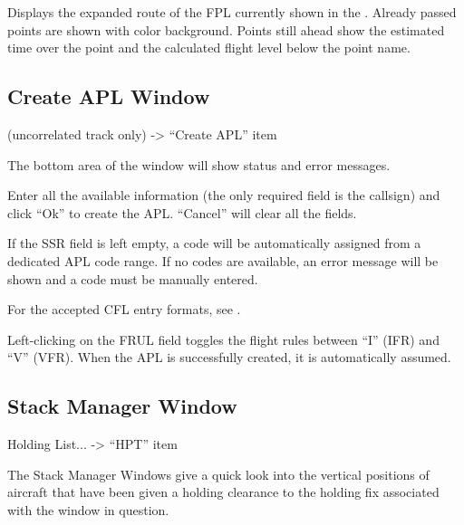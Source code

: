 \documentclass[a4paper,oneside,11pt]{memoir}
\begin{document}
\bigskip


Displays the expanded route of the FPL currently shown in the . Already passed points are shown with  color background. Points still ahead show the estimated time over the point and the calculated flight level below the point name.

\subsection{Create APL Window}
\label{win:apl}

 (uncorrelated track only) -> “Create APL” item


\bigskip

The bottom area of the window will show status and error messages.

\bigskip

Enter all the available information (the only required field is the callsign) and click “Ok” to create the APL. “Cancel” will clear all the fields.

\bigskip

If the SSR field is left empty, a code will be automatically assigned from a dedicated APL code range. If no codes are available, an error message will be shown and a code must be manually entered.

\bigskip

For the accepted CFL entry formats, see .

\bigskip

Left-clicking on the FRUL field toggles the flight rules between “I” (IFR) and “V” (VFR).
When the APL is successfully created, it is automatically assumed.

\subsection{Stack Manager Window}
\label{win:smw}
Holding List... -> “HPT” item

\bigskip


The Stack Manager Windows give a quick look into the vertical positions of aircraft that have been given a holding clearance to the holding fix associated with the window in question.
\end{document}
